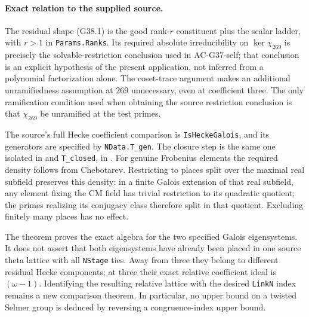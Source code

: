 \paragraph{Exact relation to the supplied source.}
The residual shape (G38.1) is the good rank-$r$ constituent
plus the scalar ladder, with $r>1$ in \texttt{Params.Ranks}.
Its required absolute irreducibility on $\ker\chi_{269}$
is precisely the solvable-restriction conclusion used in
AC-G37-self; that conclusion is an explicit hypothesis of
the present application, not inferred from a polynomial
factorization alone.
The coset-trace argument makes an additional unramifiedness
assumption at $269$ unnecessary, even at coefficient three.
The only ramification condition used when obtaining the
source restriction conclusion is that $\chi_{269}$ be
unramified at the test primes.

The source's full Hecke coefficient comparison is
\texttt{IsHeckeGalois}, and its generators are specified
by \texttt{NData.T\_gen}.  The closure step is the same
one isolated in
and \texttt{T\_closed}, in
.
For genuine Frobenius elements the required density follows
from Chebotarev.  Restricting to places split over the maximal
real subfield preserves this density: in a finite Galois
extension of that real subfield, any element fixing the CM
field has trivial restriction to its quadratic quotient;
the primes realizing its conjugacy class therefore split
in that quotient.  Excluding finitely many places has no effect.

The theorem proves the exact algebra for the two specified
Galois eigensystems.  It does not assert that both eigensystems
have already been placed in one source theta lattice with
all \texttt{NStage} ties.  Away from three they belong to
different residual Hecke components; at three their exact
relative coefficient ideal is $(\omega-1)$.
Identifying the resulting relative lattice with the desired
\texttt{LinkN} index remains a new comparison theorem.
In particular, no upper bound on a twisted Selmer group
is deduced by reversing a congruence-index upper bound.
